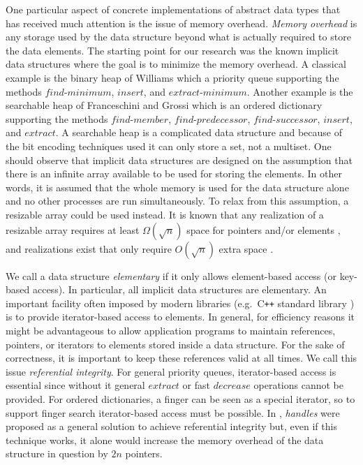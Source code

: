 \documentclass{DIKU-article}
\newcommand{\Findmin}{\mbox{$\mathit{find}$\textnormal{-}}\allowbreak{}\mbox{$\mathit{minimum}$}}
\newcommand{\Member}{\mbox{$\mathit{find}$\textnormal{-}}\allowbreak{}\mbox{$\mathit{member}$}}
\newcommand{\Predecessor}{\mbox{$\mathit{find}$\textnormal{-}}\allowbreak{}\mbox{$\mathit{predecessor}$}}
\newcommand{\Successor}{\mbox{$\mathit{find}$\textnormal{-}}\allowbreak{}\mbox{$\mathit{successor}$}}
\newcommand{\Insert}{\mbox{$\mathit{insert}$}}
\newcommand{\Extract}{\mbox{$\mathit{extract}$}}
\newcommand{\Extractmin}{\mbox{$\mathit{extract}$\textnormal{-}$\mathit{minimum}$}}
\newcommand{\Decrease}{\mbox{$\mathit{decrease}$}}
\begin{document}
One particular aspect of concrete implementations of abstract data
types that has received much attention is the issue of memory
overhead.  \emph{Memory overhead} is any storage used by the data
structure beyond what is actually required to store the data elements.
The starting point for our research was the known implicit data
structures where the goal is to minimize the memory overhead.  A
classical example is the binary heap of Williams \cite{Wil64} which a
priority queue supporting the methods \Findmin{}, \Insert{}, and
\Extractmin{}. Another example is the searchable heap of Franceschini
and Grossi \cite{FG03} which is an ordered dictionary supporting the
methods \Member{}, \Predecessor{}, \Successor{}, \Insert{}, and
\Extract{}. A searchable heap is a complicated data structure and
because of the bit encoding techniques used it can only store a set,
not a multiset. One should observe that implicit data structures are
designed on the assumption that there is an infinite array available
to be used for storing the elements. In other words, it is assumed
that the whole memory is used for the data structure alone and no
other processes are run simultaneously. To relax from this assumption,
a resizable array could be used instead.  It is known that any
realization of a resizable array requires at least $\Omega(\sqrt{n})$
space for pointers and/or elements \cite{BCDMS99}, and realizations
exist that only require $O(\sqrt{n})$ extra space \cite{BCDMS99,KM01}.

We call a data structure \emph{elementary} if it only allows
element-based access (or key-based access). In particular, all
implicit data structures are elementary.  An important facility often
imposed by modern libraries (e.g.~C\texttt{++} standard library
\cite{ISO}) is to provide iterator-based access to elements. In
general, for efficiency reasons it might be advantageous to allow
application programs to maintain references, pointers, or iterators to
elements stored inside a data structure. For the sake of correctness,
it is important to keep these references valid at all times. We call
this issue \emph{referential integrity}. For general priority queues,
iterator-based access is essential since without it general \Extract{}
or fast \Decrease{} operations cannot be provided. For ordered
dictionaries, a finger can be seen as a special iterator, so to
support finger search iterator-based access must be possible.  In
\cite{CLRS01}, \emph{handles} were proposed as a general solution to
achieve referential integrity but, even if this technique works, it
alone would increase the memory overhead of the data structure in
question by $2n$ pointers.
\end{document}
